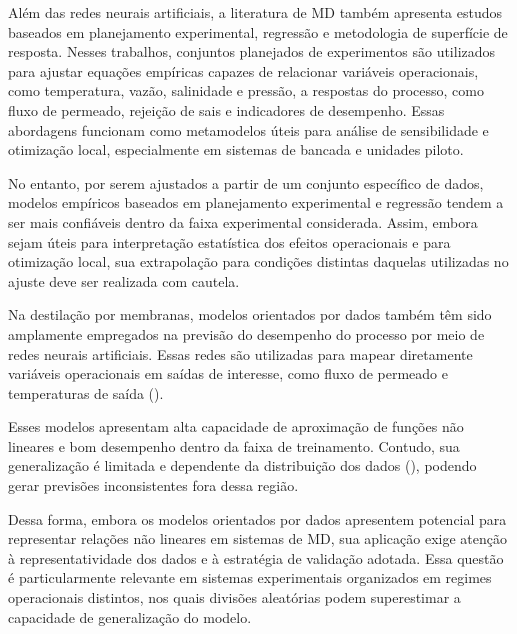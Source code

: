Além das redes neurais artificiais, a literatura de MD também apresenta estudos baseados em planejamento experimental, regressão e metodologia de superfície de resposta. Nesses trabalhos, conjuntos planejados de experimentos são utilizados para ajustar equações empíricas capazes de relacionar variáveis operacionais, como temperatura, vazão, salinidade e pressão, a respostas do processo, como fluxo de permeado, rejeição de sais e indicadores de desempenho. Essas abordagens funcionam como metamodelos úteis para análise de sensibilidade e otimização local, especialmente em sistemas de bancada e unidades piloto.

No entanto, por serem ajustados a partir de um conjunto específico de dados, modelos empíricos baseados em planejamento experimental e regressão tendem a ser mais confiáveis dentro da faixa experimental considerada. Assim, embora sejam úteis para interpretação estatística dos efeitos operacionais e para otimização local, sua extrapolação para condições distintas daquelas utilizadas no ajuste deve ser realizada com cautela.

Na destilação por membranas, modelos orientados por dados também têm sido amplamente empregados na previsão do desempenho do processo por meio de redes neurais artificiais. Essas redes são utilizadas para mapear diretamente variáveis operacionais em saídas de interesse, como fluxo de permeado e temperaturas de saída (\cite{ANN_AGMD, ANN_VMD_Fouling}).

Esses modelos apresentam alta capacidade de aproximação de funções não lineares e bom desempenho dentro da faixa de treinamento. Contudo, sua generalização é limitada e dependente da distribuição dos dados (\cite{ReviewAI_MD}), podendo gerar previsões inconsistentes fora dessa região.

Dessa forma, embora os modelos orientados por dados apresentem potencial para representar relações não lineares em sistemas de MD, sua aplicação exige atenção à representatividade dos dados e à estratégia de validação adotada. Essa questão é particularmente relevante em sistemas experimentais organizados em regimes operacionais distintos, nos quais divisões aleatórias podem superestimar a capacidade de generalização do modelo.

